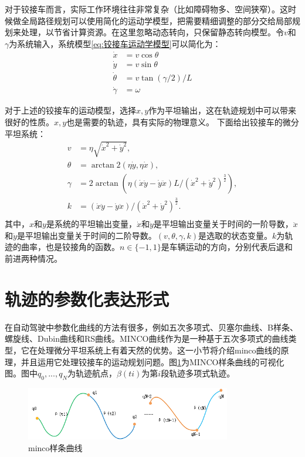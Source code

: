 \documentclass[master,academic]{ysuthesis} %
\begin{document}
		对于铰接车而言，实际工作环境往往非常复杂（比如障碍物多、空间狭窄）。这时候做全局路径规划可以使用简化的运动学模型，把需要精细调整的部分交给局部规划来处理，以节省计算资源。在这里忽略动态转向，只保留静态转向模型。令$v$和$\gamma$为系统输入，系统模型\ref{eq:铰接车运动学模型}可以简化为：
		\begin{equation}
			\begin{aligned}
				\dot{x} &= v\cos\theta\\
				\dot{y} &= v\sin\theta\\
				\dot{\theta} &= v\tan( \gamma /2 ) /L\\
				\dot{\gamma} &= \omega
			\end{aligned}
		\end{equation} 

		对于上述的铰接车的运动模型，选择$x,y$作为平坦输出，这在轨迹规划中可以带来很好的性质。$x,y$也是需要的轨迹，具有实际的物理意义。
		下面给出铰接车的微分平坦系统：
		\begin{equation}
			\begin{aligned}
				v&=\eta \sqrt{\dot{x}^2+\dot{y}^2},\\
				\theta &=\arctan2( \eta \dot{y},\eta \dot{x} ) ,\\
				\gamma &=2\arctan( \eta ( \dot{x}\ddot{y}-\dot{y}\ddot{x} ) L/( \dot{x}^2+\dot{y}^2 ) ^{\frac{3}{2}} ) ,\\
				k&=( \dot{x}\ddot{y}-\dot{y}\ddot{x} ) /( \dot{x}^2+\dot{y}^2 ) ^{\frac{3}{2}}.\\
			\end{aligned}
		\end{equation}
	其中，$x$和$y$是系统的平坦输出变量，$\dot{x}$和$\dot{y}$是平坦输出变量关于时间的一阶导数，$\ddot{x}$和$\ddot{y}$是平坦输出变量关于时间的二阶导数。$(v,\theta,\gamma,k)$是选取的状态变量。$k$为轨迹的曲率，也是铰接角的函数。$n\in\{-1,1\}$是车辆运动的方向，分别代表后退和前进两种情况。

	\section{轨迹的参数化表达形式}
	在自动驾驶中参数化曲线的方法有很多，例如五次多项式、贝塞尔曲线、B样条、螺旋线、Dubin曲线和RS曲线。MINCO曲线作为是一种基于五次多项式的曲线类型，它在处理微分平坦系统上有着天然的优势。这一小节将介绍minco曲线的原理，并且运用它处理铰接车的运动规划问题。图\ref{fig:minco}为MINCO样条曲线的可视化图。图中$q_0,...,q_N$为轨迹航点，$\beta(ti)$为第$i$段轨迹多项式轨迹。
	\begin{figure}[!ht]
		\centering
		\includegraphics[width=0.8\textwidth]{minco.png}
		\caption{minco样条曲线}
		\label{fig:minco}
	\end{figure}
\end{document}
